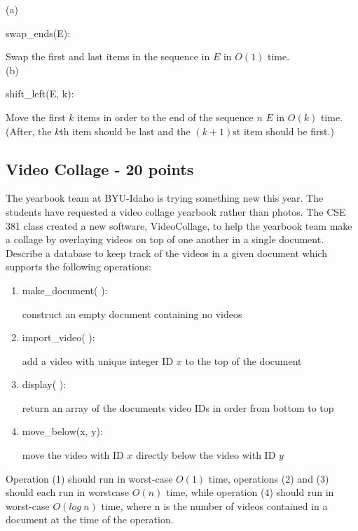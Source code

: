 \documentclass[12pt]{amsart}
\begin{document}
(a) \begin{tt} swap\_ends(E):\end{tt} Swap the first and last items in the sequence in $E$ in $O(1)$ time. 
\\

(b) \begin{tt}shift\_left(E, k):\end{tt} Move the first $k$ items in order to the end of the sequence $n$ $E$
in $O(k)$ time. (After, the $k$th item should be last and the $(k + 1)$st item should be first.)
\\

\subsection{Video Collage - 20 points}
The yearbook team at BYU-Idaho is trying something new this year. The students have requested a video collage yearbook rather than photos. The CSE 381 class created a new software, VideoCollage, to help the yearbook team make a collage by overlaying videos on top of one another in a single document. Describe a database to keep track of the videos in a given document which supports the following operations:
\begin{enumerate}
\item \begin{tt} make\_document( ):\end{tt} construct an empty document containing no videos
\item  \begin{tt} import\_video( ):\end{tt} add a video with unique integer ID $x$ to the top of the document
\item  \begin{tt} display( ):\end{tt} return an array of the documents video IDs in order from bottom to top
\item  \begin{tt} move\_below(x, y):\end{tt} move the video with ID $x$ directly below the video with ID $y$
\end{enumerate}
Operation (1) should run in worst-case $O(1)$ time, operations (2) and (3) should each run in worstcase $O(n)$ time, while operation (4) should run in worst-case $O(log\:n)$ time, where n is the number of videos contained in a document at the time of the operation.
\\
\end{document}
